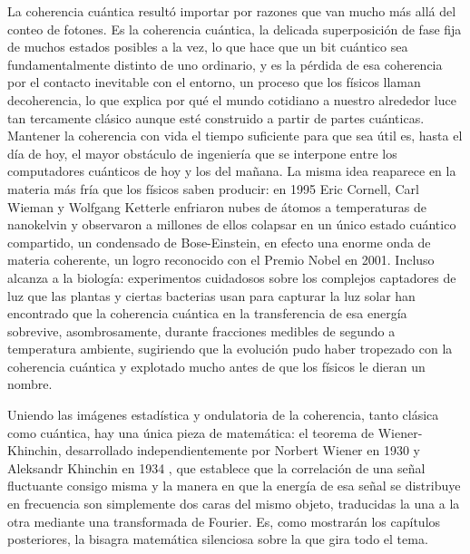 	La coherencia cuántica resultó importar por razones que van mucho más allá del conteo de fotones. Es la coherencia cuántica, la delicada superposición de fase fija de muchos estados posibles a la vez, lo que hace que un bit cuántico sea fundamentalmente distinto de uno ordinario, y es la pérdida de esa coherencia por el contacto inevitable con el entorno, un proceso que los físicos llaman decoherencia, lo que explica por qué el mundo cotidiano a nuestro alrededor luce tan tercamente clásico aunque esté construido a partir de partes cuánticas. Mantener la coherencia con vida el tiempo suficiente para que sea útil es, hasta el día de hoy, el mayor obstáculo de ingeniería que se interpone entre los computadores cuánticos de hoy y los del mañana. La misma idea reaparece en la materia más fría que los físicos saben producir: en 1995 Eric Cornell, Carl Wieman y Wolfgang Ketterle enfriaron nubes de átomos a temperaturas de nanokelvin y observaron a millones de ellos colapsar en un único estado cuántico compartido, un condensado de Bose-Einstein, en efecto una enorme onda de materia coherente, un logro reconocido con el Premio Nobel en 2001. Incluso alcanza a la biología: experimentos cuidadosos sobre los complejos captadores de luz que las plantas y ciertas bacterias usan para capturar la luz solar han encontrado que la coherencia cuántica en la transferencia de esa energía sobrevive, asombrosamente, durante fracciones medibles de segundo a temperatura ambiente, sugiriendo que la evolución pudo haber tropezado con la coherencia cuántica y explotado mucho antes de que los físicos le dieran un nombre.

	Uniendo las imágenes estadística y ondulatoria de la coherencia, tanto clásica como cuántica, hay una única pieza de matemática: el teorema de Wiener-Khinchin, desarrollado independientemente por Norbert Wiener en 1930 \cite{wiener1930generalized} y Aleksandr Khinchin en 1934 \cite{khinchin1934korrelationstheorie}, que establece que la correlación de una señal fluctuante consigo misma y la manera en que la energía de esa señal se distribuye en frecuencia son simplemente dos caras del mismo objeto, traducidas la una a la otra mediante una transformada de Fourier. Es, como mostrarán los capítulos posteriores, la bisagra matemática silenciosa sobre la que gira todo el tema.

